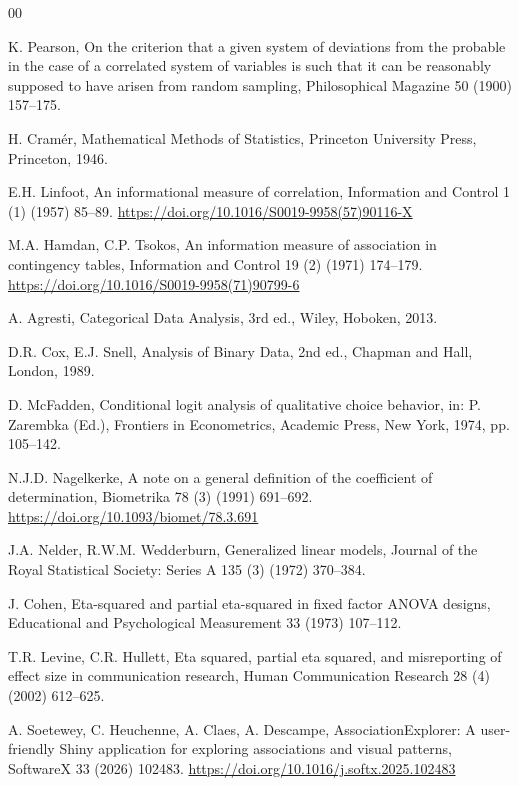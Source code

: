 \documentclass[preprint,12pt,a4paper]{elsarticle}
\numberwithin{equation}{section}
\begin{document}
\begin{thebibliography}{00}

K. Pearson, On the criterion that a given system of deviations from the probable in the case of a correlated system of variables is such that it can be reasonably supposed to have arisen from random sampling, Philosophical Magazine 50 (1900) 157--175.

H. Cram\'er, Mathematical Methods of Statistics, Princeton University Press, Princeton, 1946.

E.H. Linfoot, An informational measure of correlation, Information and Control 1 (1) (1957) 85--89. \url{https://doi.org/10.1016/S0019-9958(57)90116-X}

M.A. Hamdan, C.P. Tsokos, An information measure of association in contingency tables, Information and Control 19 (2) (1971) 174--179. \url{https://doi.org/10.1016/S0019-9958(71)90799-6}

A. Agresti, Categorical Data Analysis, 3rd ed., Wiley, Hoboken, 2013.

D.R. Cox, E.J. Snell, Analysis of Binary Data, 2nd ed., Chapman and Hall, London, 1989.

D. McFadden, Conditional logit analysis of qualitative choice behavior, in: P. Zarembka (Ed.), Frontiers in Econometrics, Academic Press, New York, 1974, pp. 105--142.

N.J.D. Nagelkerke, A note on a general definition of the coefficient of determination, Biometrika 78 (3) (1991) 691--692. \url{https://doi.org/10.1093/biomet/78.3.691}

J.A. Nelder, R.W.M. Wedderburn, Generalized linear models, Journal of the Royal Statistical Society: Series A 135 (3) (1972) 370--384.

J. Cohen, Eta-squared and partial eta-squared in fixed factor ANOVA designs, Educational and Psychological Measurement 33 (1973) 107--112.

T.R. Levine, C.R. Hullett, Eta squared, partial eta squared, and misreporting of effect size in communication research, Human Communication Research 28 (4) (2002) 612--625.

A. Soetewey, C. Heuchenne, A. Claes, A. Descampe, AssociationExplorer: A user-friendly Shiny application for exploring associations and visual patterns, SoftwareX 33 (2026) 102483. \url{https://doi.org/10.1016/j.softx.2025.102483}


\end{thebibliography}
\end{document}
